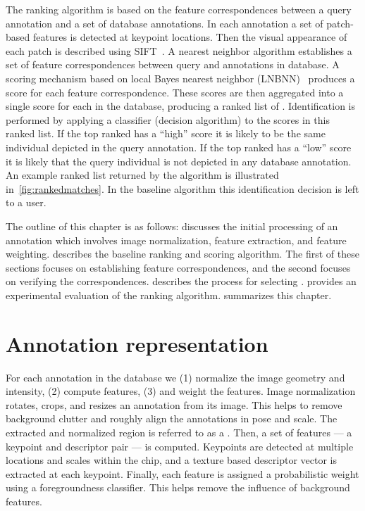     The ranking algorithm is based on the feature correspondences between a query annotation and a set of database
    annotations. In each annotation a set of patch-based features is detected at keypoint locations. Then the
    visual appearance of each patch is described using SIFT~\cite{lowe_distinctive_2004}. A nearest neighbor
    algorithm establishes a set of feature correspondences between query and annotations in database. A scoring
    mechanism based on local \naive{} Bayes nearest neighbor (LNBNN)~\cite{mccann_local_2012} produces a score for
    each feature correspondence. These scores are then aggregated into a single score for each \name{} in the
    database, producing a ranked list of \names{}. Identification is performed by applying a classifier (decision
    algorithm) to the scores in this ranked list. If the top ranked \name{} has a ``high'' score it is likely to be
    the same individual depicted in the query annotation. If the top ranked \name{} has a ``low'' score it is
    likely that the query individual is not depicted in any database annotation. An example ranked list returned by
    the algorithm is illustrated in~\cref{fig:rankedmatches}. In the baseline algorithm this identification
    decision is left to a user.

    The outline of this chapter is as follows:  discusses the initial processing of an
    annotation which involves image normalization, feature extraction, and feature weighting.
     describes the baseline ranking and scoring algorithm. The first of these
    sections focuses on establishing feature correspondences, and the second focuses on verifying the
    correspondences.  describes the process for selecting \exemplars{}.
     provides an experimental evaluation of the ranking algorithm.
     summarizes this chapter.

    \rankedmatches{}

\section{Annotation representation}\label{sec:annotrepr}
  
    For each annotation in the database we (1) normalize the image geometry and intensity, (2) compute features,
    (3) and weight the features.
    Image normalization rotates, crops, and resizes an annotation from its image. This helps to remove background
    clutter and roughly align the annotations in pose and scale. The extracted and normalized region is referred to
    as a .
    Then, a set of features ---  a keypoint and descriptor pair --- is computed. Keypoints are detected at multiple
    locations and scales within the chip, and a texture based descriptor vector is extracted at each keypoint.
    Finally, each feature is assigned a probabilistic weight using a foregroundness classifier. This helps remove
    the influence of background features.

